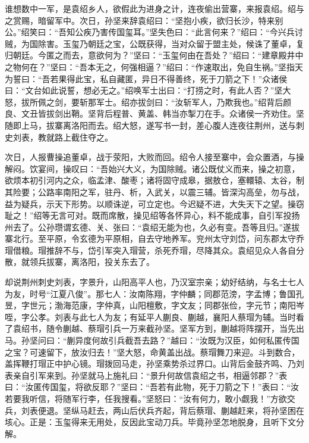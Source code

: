 谁想数中一军，是袁绍乡人，欲假此为进身之计，连夜偷出营寨，来报袁绍。绍与之赏赐，暗留军中。次日，孙坚来辞袁绍曰：“坚抱小疾，欲归长沙，特来别公。”绍笑曰：“吾知公疾乃害传国玺耳。”坚失色曰：“此言何来？”绍曰：“今兴兵讨贼，为国除害。玉玺乃朝廷之宝，公既获得，当对众留于盟主处，候诛了董卓，复归朝廷。今匿之而去，意欲何为？”坚曰：“玉玺何由在吾处？”绍曰：“建章殿井中之物何在？”坚曰：“吾本无之，何强相逼？”绍曰：“作速取出，免自生祸。”坚指天为誓曰：“吾若果得此宝，私自藏匿，异日不得善终，死于刀箭之下！”众诸侯曰：“文台如此说誓，想必无之。”绍唤军士出曰：“打捞之时，有此人否？”坚大怒，拔所佩之剑，要斩那军士。绍亦拔剑曰：“汝斩军人，乃欺我也。”绍背后颜良、文丑皆拔剑出鞘。坚背后程普、黄盖、韩当亦掣刀在手。众诸侯一齐劝住。坚随即上马，拔寨离洛阳而去。绍大怒，遂写书一封，差心腹人连夜往荆州，送与刺史刘表，教就路上截住夺之。

次日，人报曹操追董卓，战于荥阳，大败而回。绍令人接至寨中，会众置酒，与操解闷。饮宴间，操叹曰：“吾始兴大义，为国除贼。诸公既仗义而来，操之初意，欲烦本初引河内之众，临孟津、酸枣；诸将固守成皋，据敖仓，塞轘辕、太谷，制其险要；公路率南阳之军，驻丹、析，入武关，以震三辅。皆深沟高垒，勿与战，益为疑兵，示天下形势。以顺诛逆，可立定也。今迟疑不进，大失天下之望。操窃耻之！”绍等无言可对。既而席散，操见绍等各怀异心，料不能成事，自引军投扬州去了。公孙瓒谓玄德、关、张曰：“袁绍无能为也，久必有变。吾等且归。”遂拔寨北行。至平原，令玄德为平原相，自去守地养军。兖州太守刘岱，问东郡太守乔瑁借粮。瑁推辞不与，岱引军突入瑁营，杀死乔瑁，尽降其众。袁绍见众人各自分散，就领兵拔寨，离洛阳，投关东去了。

却说荆州刺史刘表，字景升，山阳高平人也，乃汉室宗亲；幼好结纳，与名士七人为友，时号“江夏八俊”。那七人：汝南陈翔，字仲麟；同郡范滂，字孟博；鲁国孔昱，字世元；渤海范康，字仲真，山阳檀敷，字文友；同郡张俭，字元节；南阳岑咥，字公孝。刘表与此七人为友；有延平人蒯良、蒯越，襄阳人蔡瑁为辅。当时看了袁绍书，随令蒯越、蔡瑁引兵一万来截孙坚。坚军方到，蒯越将阵摆开，当先出马。孙坚问曰：“蒯异度何故引兵截吾去路？”越曰：“汝既为汉臣，如何私匿传国之宝？可速留下，放汝归去！”坚大怒，命黄盖出战。蔡瑁舞刀来迎。斗到数合，盖挥鞭打瑁正中护心镜。瑁拨回马走，孙坚乘势杀过界口。山背后金鼓齐鸣、乃刘表亲自引军来到。孙坚就马上施礼曰：“景升何故信袁绍之书，相逼邻郡？”表曰：“汝匿传国玺，将欲反耶？”坚曰：“吾若有此物，死于刀箭之下！”表曰：“汝若要我听信，将随军行李，任我搜看。”坚怒曰：“汝有何力，敢小觑我！”方欲交兵，刘表便退。坚纵马赶去，两山后伏兵齐起，背后蔡瑁、蒯越赶来，将孙坚困在垓心。正是：玉玺得来无用处，反因此宝动刀兵。毕竟孙坚怎地脱身，且听下文分解。